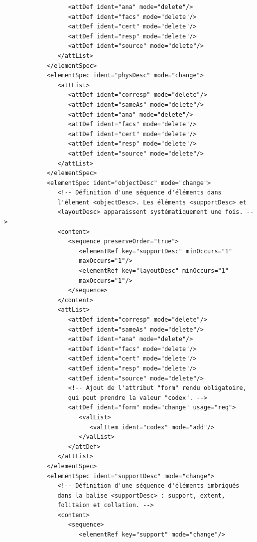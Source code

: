 \documentclass[a4paper,12pt,twoside]{book}
\begin{document}
\begin{verbatim}
                  <attDef ident="ana" mode="delete"/>
                  <attDef ident="facs" mode="delete"/>
                  <attDef ident="cert" mode="delete"/>
                  <attDef ident="resp" mode="delete"/>
                  <attDef ident="source" mode="delete"/>
               </attList>
            </elementSpec>
            <elementSpec ident="physDesc" mode="change">
               <attList>
                  <attDef ident="corresp" mode="delete"/>
                  <attDef ident="sameAs" mode="delete"/>
                  <attDef ident="ana" mode="delete"/>
                  <attDef ident="facs" mode="delete"/>
                  <attDef ident="cert" mode="delete"/>
                  <attDef ident="resp" mode="delete"/>
                  <attDef ident="source" mode="delete"/>
               </attList>
            </elementSpec>
            <elementSpec ident="objectDesc" mode="change">
               <!-- Définition d'une séquence d'éléments dans 
               l'élement <objectDesc>. Les éléments <supportDesc> et 
               <layoutDesc> apparaissent systématiquement une fois. -->
               <content>
                  <sequence preserveOrder="true">
                     <elementRef key="supportDesc" minOccurs="1" 
                     maxOccurs="1"/>
                     <elementRef key="layoutDesc" minOccurs="1" 
                     maxOccurs="1"/>
                  </sequence>
               </content>
               <attList>
                  <attDef ident="corresp" mode="delete"/>
                  <attDef ident="sameAs" mode="delete"/>
                  <attDef ident="ana" mode="delete"/>
                  <attDef ident="facs" mode="delete"/>
                  <attDef ident="cert" mode="delete"/>
                  <attDef ident="resp" mode="delete"/>
                  <attDef ident="source" mode="delete"/>
                  <!-- Ajout de l'attribut "form" rendu obligatoire, 
                  qui peut prendre la valeur "codex". -->
                  <attDef ident="form" mode="change" usage="req">
                     <valList>
                        <valItem ident="codex" mode="add"/>
                     </valList>
                  </attDef>
               </attList>
            </elementSpec>
            <elementSpec ident="supportDesc" mode="change">
               <!-- Définition d'une séquence d'éléments imbriqués 
               dans la balise <supportDesc> : support, extent, 
               folitaion et collation. -->
               <content>
                  <sequence>
                     <elementRef key="support" mode="change"/>

\end{verbatim}
\end{document}
